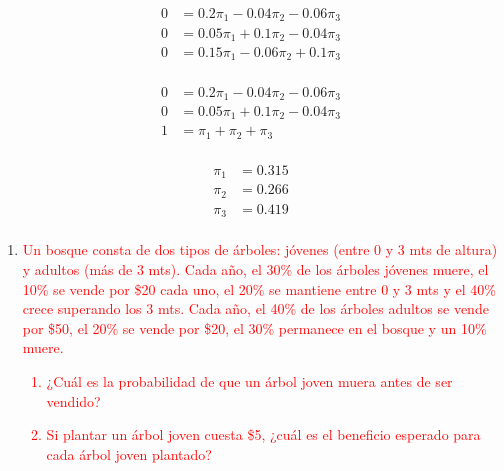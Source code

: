 \documentclass{templateNote}
\begin{document}
\begin{center}
\begin{enumerate}[label=\alph*)]
        \begin{align*}
            0 &= 0.2\pi_1 - 0.04\pi_2 - 0.06\pi_3 \\
            0 &= 0.05\pi_1 + 0.1\pi_2 - 0.04\pi_3 \\
            0 &= 0.15\pi_1 - 0.06\pi_2 + 0.1\pi_3 \\
        \end{align*}
        
        
        \begin{align*}
            0 &= 0.2\pi_1 - 0.04\pi_2 - 0.06\pi_3 \\
            0 &= 0.05\pi_1 + 0.1\pi_2 - 0.04\pi_3 \\
            1 &= \pi_1 + \pi_2 + \pi_3 \\
        \end{align*}
        
        
        \begin{align*}
            \pi_1 &= 0.315 \\
            \pi_2 &= 0.266 \\
            \pi_3 &= 0.419 \\
        \end{align*}

    \end{enumerate}
\end{center}

\begin{enumerate}[resume, start=8]
    \newpage
    \item \textcolor{red}{Un bosque consta de dos tipos de árboles: jóvenes (entre 0 y 3 mts de altura) y adultos (más
    de 3 mts). Cada año, el 30\% de los árboles jóvenes muere, el 10\% se vende por \$20 cada uno,
    el 20\% se mantiene entre 0 y 3 mts y el 40\% crece superando los 3 mts. Cada año, el 40\% de
    los árboles adultos se vende por \$50, el 20\% se vende por \$20, el 30\% permanece en el bosque
    y un 10\% muere.
    \begin{enumerate}[label=\alph*)]
        \item ¿Cuál es la probabilidad de que un árbol joven muera antes de ser vendido?
        \item Si plantar un árbol joven cuesta \$5, ¿cuál es el beneficio esperado para cada árbol joven plantado?
    \end{enumerate}}

\end{enumerate}
\end{document}
